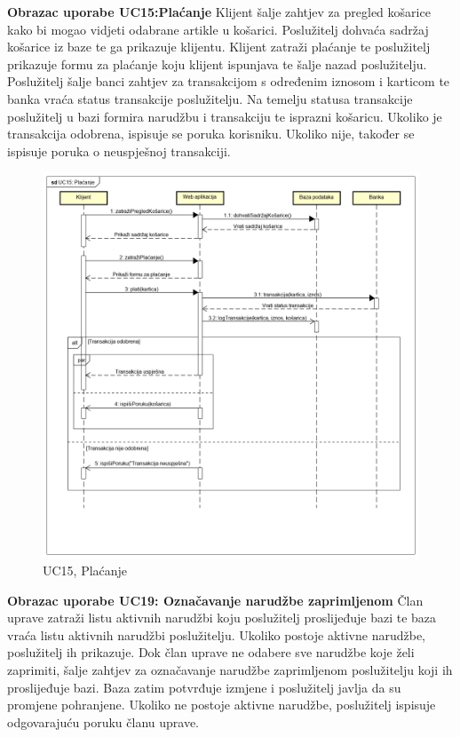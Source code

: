 			\textbf {Obrazac uporabe UC15:Plaćanje}
			\bigbreak
			\textnormal {Klijent šalje zahtjev za pregled košarice kako bi mogao vidjeti odabrane artikle u košarici. Poslužitelj dohvaća sadržaj košarice iz baze te ga prikazuje klijentu. Klijent zatraži plaćanje te poslužitelj prikazuje formu za plaćanje koju klijent ispunjava te šalje nazad poslužitelju. Poslužitelj šalje banci zahtjev za transakcijom s određenim iznosom i karticom te banka vraća status transakcije poslužitelju. Na temelju statusa transakcije poslužitelj u bazi formira narudžbu i transakciju te isprazni košaricu. Ukoliko je transakcija odobrena, ispisuje se poruka korisniku. Ukoliko nije, također se ispisuje poruka o neuspješnoj transakciji.}
				\begin{figure}[H]
					\includegraphics[width=\linewidth]{dijagrami/UC15.png}
					\centering
					\caption{UC15, Plaćanje}
					\label{fig:SequanceDiagram2}
				\end{figure}
			\bigskip
			\bigskip
			\textbf{Obrazac uporabe UC19: Označavanje narudžbe zaprimljenom}
			\bigbreak
			\textnormal {Član uprave zatraži listu aktivnih narudžbi koju poslužitelj proslijeđuje bazi te baza vraća listu aktivnih narudžbi poslužitelju. Ukoliko postoje aktivne narudžbe, poslužitelj ih prikazuje. Dok član uprave ne odabere sve narudžbe koje želi zaprimiti, šalje zahtjev za označavanje narudžbe zaprimljenom poslužitelju koji ih proslijeđuje bazi. Baza zatim potvrđuje izmjene i poslužitelj javlja da su promjene pohranjene. Ukoliko ne postoje aktivne narudžbe, poslužitelj ispisuje odgovarajuću poruku članu uprave.
			}
